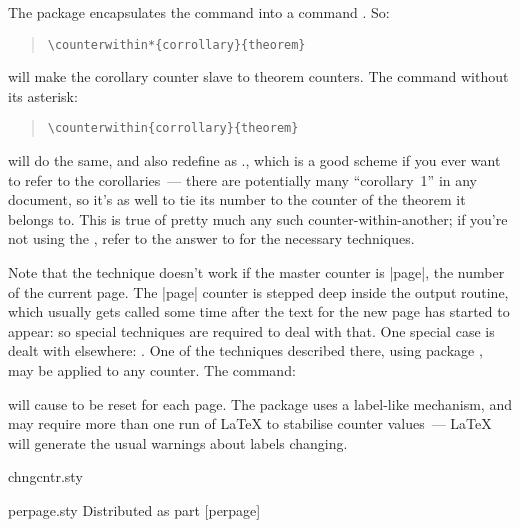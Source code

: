 The  package encapsulates the 
command into a command .  So:
\begin{quote}
\begin{verbatim}
\counterwithin*{corrollary}{theorem}
\end{verbatim}
\end{quote}
will make the corollary counter slave to theorem counters.  The
command without its asterisk:
\begin{quote}
\begin{verbatim}
\counterwithin{corrollary}{theorem}
\end{verbatim}
\end{quote}
will do the same, and also redefine  as %
., which is a good scheme
if you ever want to refer to the corollaries~--- there are potentially
many ``corollary~1'' in any document, so it's as well to tie its number
to the counter of the theorem it belongs to.  This is true of pretty
much any such counter-within-another; if you're not using the
, refer to the answer to %
 for
the necessary techniques.

Note that the technique doesn't work if the master counter is |page|,
the number of the current page.  The |page| counter is stepped deep
inside the output routine, which usually gets called some time after
the text for the new page has started to appear: so special
techniques are required to deal with that.  One special case is dealt
with elsewhere: .  One
of the techniques described there, using package ,
may be applied to any counter.  The command:
\begin{quote}
\end{quote}
will cause  to be reset for each page.  The package uses
a label-like mechanism, and may require more than one run of \LaTeX{}
to stabilise counter values~--- \LaTeX{} will generate the usual
warnings about labels changing.
\begin{ctanrefs}
\item[chngcntr.sty]
\item[perpage.sty]Distributed as part [perpage]
\end{ctanrefs}


